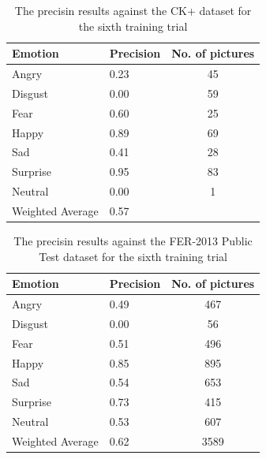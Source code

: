 \documentclass[runningheads,a4paper,11pt]{report}
\begin{document}
\begin{table}[htbp]
	\caption{The precisin results against the CK+ dataset for the sixth training trial}
	\label{fer_training_28k_01_squared_hinge_loss_ckp}
		\begin{center}
			\begin{tabular}{p{110pt}p{110pt}c}
				\textbf{Emotion}& \textbf{Precision}& \textbf{No. of pictures} \\
				\hline\hline
				Angry& 0.23& 45 \\
				Disgust& 0.00& 59 \\
				Fear& 0.60& 25 \\
				Happy& 0.89& 69 \\
				Sad& 0.41& 28 \\
				Surprise& 0.95& 83 \\
				Neutral& 0.00& 1 \\
				\hline
				Weighted Average& 0.57
			\end{tabular}
		\end{center}
\end{table}
\begin{table}[htbp]
	\caption{The precisin results against the FER-2013 Public Test dataset for the sixth training trial}
	\label{fer_training_28k_01_squared_hinge_loss_public_test}
		\begin{center}
			\begin{tabular}{p{110pt}p{110pt}c}
				\textbf{Emotion}& \textbf{Precision}& \textbf{No. of pictures} \\
				\hline\hline
				Angry& 0.49& 467 \\
				Disgust& 0.00& 56 \\
				Fear& 0.51& 496 \\
				Happy& 0.85& 895 \\
				Sad& 0.54& 653 \\
				Surprise& 0.73& 415 \\
				Neutral& 0.53& 607 \\
				\hline
				Weighted Average& 0.62 &3589
			\end{tabular}
		\end{center}
\end{table}
\end{document}
